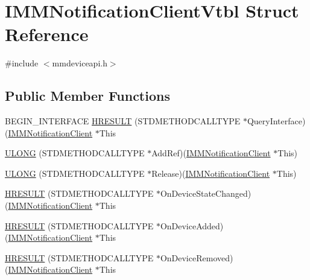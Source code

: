 \hypertarget{struct_i_m_m_notification_client_vtbl}{}\section{I\+M\+M\+Notification\+Client\+Vtbl Struct Reference}
\label{struct_i_m_m_notification_client_vtbl}


{\ttfamily \#include $<$mmdeviceapi.\+h$>$}

\subsection*{Public Member Functions}
\begin{DoxyCompactItemize}
\item 
B\+E\+G\+I\+N\+\_\+\+I\+N\+T\+E\+R\+F\+A\+CE \hyperlink{struct_i_m_m_notification_client_vtbl_a3b879dbdb17c63ac9bbd98cc42b13fc2}{H\+R\+E\+S\+U\+LT} (S\+T\+D\+M\+E\+T\+H\+O\+D\+C\+A\+L\+L\+T\+Y\+PE $\ast$Query\+Interface)(\hyperlink{mmdeviceapi_8h_a649fdb1d4867aa915327ca568a7bb278}{I\+M\+M\+Notification\+Client} $\ast$This
\item 
\hyperlink{struct_i_m_m_notification_client_vtbl_aba00c1aa02052e75ff41626f204003b2}{U\+L\+O\+NG} (S\+T\+D\+M\+E\+T\+H\+O\+D\+C\+A\+L\+L\+T\+Y\+PE $\ast$Add\+Ref)(\hyperlink{mmdeviceapi_8h_a649fdb1d4867aa915327ca568a7bb278}{I\+M\+M\+Notification\+Client} $\ast$This)
\item 
\hyperlink{struct_i_m_m_notification_client_vtbl_a566c67d4870a9308a688f5c67149d7fd}{U\+L\+O\+NG} (S\+T\+D\+M\+E\+T\+H\+O\+D\+C\+A\+L\+L\+T\+Y\+PE $\ast$Release)(\hyperlink{mmdeviceapi_8h_a649fdb1d4867aa915327ca568a7bb278}{I\+M\+M\+Notification\+Client} $\ast$This)
\item 
\hyperlink{struct_i_m_m_notification_client_vtbl_a1a7c91fa9aaa8094da215368a284f9b1}{H\+R\+E\+S\+U\+LT} (S\+T\+D\+M\+E\+T\+H\+O\+D\+C\+A\+L\+L\+T\+Y\+PE $\ast$On\+Device\+State\+Changed)(\hyperlink{mmdeviceapi_8h_a649fdb1d4867aa915327ca568a7bb278}{I\+M\+M\+Notification\+Client} $\ast$This
\item 
\hyperlink{struct_i_m_m_notification_client_vtbl_a22a3e974f6ffa35c3159bec8d0a79c0b}{H\+R\+E\+S\+U\+LT} (S\+T\+D\+M\+E\+T\+H\+O\+D\+C\+A\+L\+L\+T\+Y\+PE $\ast$On\+Device\+Added)(\hyperlink{mmdeviceapi_8h_a649fdb1d4867aa915327ca568a7bb278}{I\+M\+M\+Notification\+Client} $\ast$This
\item 
\hyperlink{struct_i_m_m_notification_client_vtbl_a3311d8cf335d09a237301e93f2365cc5}{H\+R\+E\+S\+U\+LT} (S\+T\+D\+M\+E\+T\+H\+O\+D\+C\+A\+L\+L\+T\+Y\+PE $\ast$On\+Device\+Removed)(\hyperlink{mmdeviceapi_8h_a649fdb1d4867aa915327ca568a7bb278}{I\+M\+M\+Notification\+Client} $\ast$This

\end{DoxyCompactItemize}
